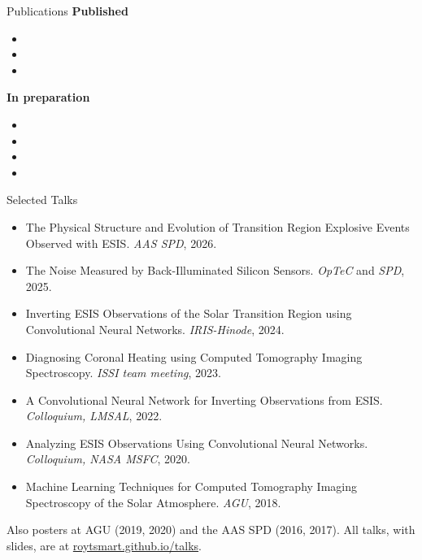 \documentclass{resume}
\newenvironment{entries}{%
	\small\raggedright
	\begin{itemize}[leftmargin=*, topsep=2pt, itemsep=1pt, parsep=0pt]%
}{%
	\end{itemize}%
}
\begin{document}
\begin{rSection}{Publications}
	\textbf{Published}
	\begin{entries}
		\item {}
		\item {}
		\item {}
	\end{entries}

	\textbf{In preparation}
	\begin{entries}
		\item {}
		\item {}
		\item {}
		\item {}
	\end{entries}
\end{rSection}

\begin{rSection}{Selected Talks}
	\begin{entries}
		\item The Physical Structure and Evolution of Transition Region Explosive Events Observed with ESIS. \textit{AAS SPD}, 2026.
		\item The Noise Measured by Back-Illuminated Silicon Sensors. \textit{OpTeC} and \textit{SPD}, 2025.
		\item Inverting ESIS Observations of the Solar Transition Region using Convolutional Neural Networks. \textit{IRIS-Hinode}, 2024.
		\item Diagnosing Coronal Heating using Computed Tomography Imaging Spectroscopy. \textit{ISSI team meeting}, 2023.
		\item A Convolutional Neural Network for Inverting Observations from ESIS. \textit{Colloquium, LMSAL}, 2022.
		\item Analyzing ESIS Observations Using Convolutional Neural Networks. \textit{Colloquium, NASA MSFC}, 2020.
		\item Machine Learning Techniques for Computed Tomography Imaging Spectroscopy of the Solar Atmosphere. \textit{AGU}, 2018.
	\end{entries}
	\small
	Also posters at AGU (2019, 2020) and the AAS SPD (2016, 2017). All talks, with slides, are at \href{https://roytsmart.github.io/talks.html}{roytsmart.github.io/talks}.
\end{rSection}
\end{document}
